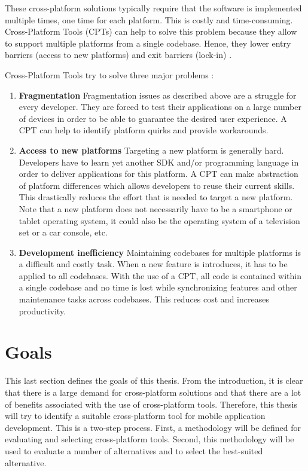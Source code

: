 These cross-platform solutions typically require that the software is implemented multiple times, one time for each platform. This is costly and time-consuming. Cross-Platform Tools (CPTs) can help to solve this problem because they allow to support multiple platforms from a single codebase. Hence, they lower entry barriers (access to new platforms) and exit barriers (lock-in) \cite{VMCPT:2012}. 

Cross-Platform Tools try to solve three major problems \cite{VMCPT:2012}: 

\begin{enumerate}
    \item \textbf{Fragmentation} Fragmentation issues as described above are a struggle for every developer. They are forced to test their applications on a large number of devices in order to be able to guarantee the desired user experience. A CPT can help to identify platform quirks and provide workarounds. 
    \item \textbf{Access to new platforms} Targeting a new platform is generally hard. Developers have to learn yet another SDK and/or programming language in order to deliver applications for this platform. A CPT can make abstraction of platform differences which allows developers to reuse their current skills. This drastically reduces the effort that is needed to target a new platform. Note that a new platform does not necessarily have to be a smartphone or tablet operating system, it could also be the operating system of a television set or a car console, etc.
    \item \textbf{Development inefficiency} Maintaining codebases for multiple platforms is a difficult and costly task. When a new feature is introduces, it has to be applied to all codebases. With the use of a CPT, all code is contained within a single codebase and no time is lost while synchronizing features and other maintenance tasks across codebases. This reduces cost and increases productivity. 
\end{enumerate}

\section{Goals}

This last section defines the goals of this thesis. From the introduction, it is clear that there is a large demand for cross-platform solutions and that there are a lot of benefits associated with the use of cross-platform tools. Therefore, this thesis will try to identify a suitable cross-platform tool for mobile application development. This is a two-step process. First, a methodology will be defined for evaluating and selecting cross-platform tools. Second, this methodology will be used to evaluate a number of alternatives and to select the best-suited alternative.